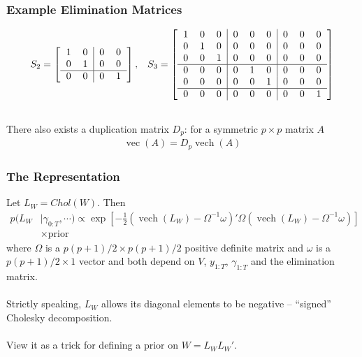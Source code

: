 \documentclass[xcolor=dvipsnames]{beamer}
\DeclareMathOperator{\vech}{vech}
\DeclareMathOperator{\vect}{vec}
\begin{document}
\begin{frame}
\frametitle{Example Elimination Matrices}
\begin{align*}
S_2 = \left[\begin{tabular}{cc|cc} 1 & 0 & 0 & 0 \\ 0 & 1 & 0 & 0 \\\hline 0 & 0 & 0 & 1 \end{tabular}\right], && S_3 =  \left[\begin{tabular}{ccc|ccc|ccc}
1 & 0 & 0 & 0 & 0 & 0 & 0 & 0 & 0  \\ 
0 & 1 & 0 & 0 & 0 & 0 & 0 & 0 & 0 \\ 
0 & 0 & 1 & 0 & 0 & 0 & 0 & 0 & 0 \\\hline
0 & 0 & 0 & 0 & 1 & 0 & 0 & 0 & 0 \\
0 & 0 & 0 & 0 & 0 & 1 & 0 & 0 & 0 \\\hline
0 & 0 & 0 & 0 & 0 & 0 & 0 & 0 & 1 \\
\end{tabular}\right]\\~\\
\end{align*}
\pause
There also exists a duplication matrix $D_p$: for a symmetric $p\times p$ matrix $A$
\begin{align*}
\vect(A)=D_p\vech(A)
\end{align*}
\end{frame}

\begin{frame}
\frametitle{The Representation}
Let $L_W=Chol(W)$. Then
\begin{align*}
  p(L_W&|\gamma_{0:T},\cdots)\propto \exp\left[-\frac{1}{2}\left(\vech(L_W) - \Omega^{-1}\omega\right)'\Omega\left(\vech(L_W) - \Omega^{-1}\omega\right)\right]\\
&\times \mbox{prior}
\end{align*}
where $\Omega$ is a $p(p+1)/2\times p(p+1)/2$ positive definite matrix and $\omega$ is a $p(p+1)/2\times 1$ vector and both depend on $V$, $y_{1:T}$, $\gamma_{1:T}$ and the elimination matrix.\\~\\
\pause
Strictly speaking, $L_W$ allows its diagonal elements to be negative -- ``signed'' Cholesky decomposition.\\~\\
\pause
View it as a trick for defining a prior on $W=L_WL_W'$.
\end{frame}
\end{document}
